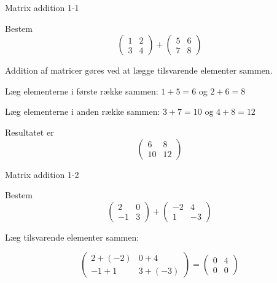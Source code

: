 \documentclass{article}
\begin{document}

\tableofcontents
\newpage

\begin{exercise}{Matrix addition 1-1}

Bestem
\[
\begin{pmatrix} 1 & 2 \\ 3 & 4 \end{pmatrix} + \begin{pmatrix} 5 & 6 \\ 7 & 8 \end{pmatrix}
\]


\hint

Addition af matricer gøres ved at lægge tilsvarende elementer sammen.

\hint

Læg elementerne i første række sammen: $1 + 5 = 6$ og $2 + 6 = 8$

\hint

Læg elementerne i anden række sammen: $3 + 7 = 10$ og $4 + 8 = 12$

\hint

Resultatet er
\[
\begin{pmatrix} 6 & 8 \\ 10 & 12 \end{pmatrix}
\]

\end{exercise}

\newpage

\begin{exercise}{Matrix addition 1-2}

Bestem
\[
\begin{pmatrix} 2 & 0 \\ -1 & 3 \end{pmatrix} + \begin{pmatrix} -2 & 4 \\ 1 & -3 \end{pmatrix}
\]


\hint

Læg tilsvarende elementer sammen:

\hint
\[
\begin{pmatrix} 2 + (-2) & 0 + 4 \\ -1 + 1 & 3 + (-3) \end{pmatrix} = \begin{pmatrix} 0 & 4 \\ 0 & 0 \end{pmatrix}
\]

\end{exercise}
\end{document}
